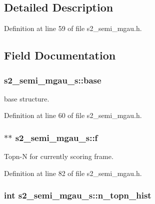 \subsection{Detailed Description}


Definition at line 59 of file s2\-\_\-semi\-\_\-mgau.\-h.



\subsection{Field Documentation}
\subsubsection[{base}]{ s2\-\_\-semi\-\_\-mgau\-\_\-s\-::base}\label{structs2__semi__mgau__s_a9002aae86249006f0b045e5203ec9687}


base structure. 



Definition at line 60 of file s2\-\_\-semi\-\_\-mgau.\-h.

\subsubsection[{f}]{$\ast$$\ast$ s2\-\_\-semi\-\_\-mgau\-\_\-s\-::f}\label{structs2__semi__mgau__s_ad8cb7f058bcc7402dd6a41c61f1b26e5}


Topn-\/\-N for currently scoring frame. 



Definition at line 82 of file s2\-\_\-semi\-\_\-mgau.\-h.

\subsubsection[{n\-\_\-topn\-\_\-hist}]{\setlength{\rightskip}{0pt plus 5cm}int s2\-\_\-semi\-\_\-mgau\-\_\-s\-::n\-\_\-topn\-\_\-hist}\label{structs2__semi__mgau__s_a3cbc9fe683da5b7befe6b2712adae327}


